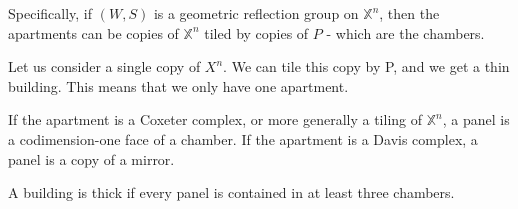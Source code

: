 \documentclass[12pt]{article}
\begin{document}
Specifically, if $(W,S)$ is a geometric reflection group on $\mathbb{X}^n$, then the apartments can be copies of $\mathbb{X}^n$ tiled by copies of $P$ - which are the chambers. 

\begin{example}
    Let us consider a single copy of $X^n$. We can tile this copy by P, and we get a thin building. This means that we only have one apartment. 
\end{example}

\begin{definition}
If the apartment is a Coxeter complex, or more generally a tiling of $\mathbb{X}^n$, a panel is a codimension-one face of a chamber. If the apartment is a Davis complex, a panel is a copy of a mirror.
\end{definition}

\begin{definition}
    A building is thick if every panel is contained in at least three chambers.
\end{definition}
\end{document}
